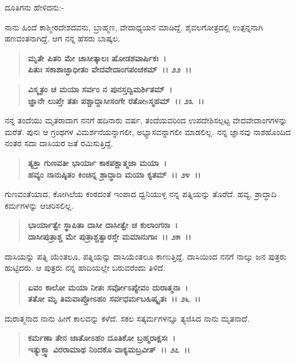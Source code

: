 \begin{flushleft}
ದೂತಿಗನು ಹೇಳಿದನು:-
\end{flushleft}

ನಾನು ಹಿಂದೆ ಕಾಶ್ಮೀರದೇಶದವನು, ಬ್ರಾಹ್ಮಣ, ವೇದಾಧ್ಯಯನ ಮಾಡಿದ್ದೆ. ಶೈವಲಗೋತ್ರದಲ್ಲಿ ಉತ್ಪನ್ನನಾಗಿ ಹಣವಂತನಾಗಿದ್ದೆ. ಆಗ ನನ್ನ ಹೆಸರು ಬಾಷ್ಕಲ.

\begin{verse}
\textbf{ಮೃತೇ ಪಿತರಿ ಮೇ ಚಾಸೀತ್ಕಾಲಃ ಷೋಡಶವಾರ್ಷಿಕಃ~।}\\\textbf{ಪಿತುಃ ಸಕಾಶಾಚ್ಛಾಧೀತಂ ವೇದವೇದಾಂಗಪಂಚಕಮ್~।। ೨೨~।। }
\end{verse}

\begin{verse}
\textbf{ವಿಸ್ಮೃತಂ ಚ ಮಯಾ ಸರ್ವಂ ನ ಪುನಸ್ತದ್ವಿಮರ್ಶಿತಮ್~।}\\\textbf{ಜ್ಞಾನೇ ಲುಪ್ತೇ ತತಃ ಪಶ್ಚಾದ್ದಾಸೀಸಂಗೇ ರತೋsಸ್ಮಹಮ್~।। ೨೩~।।}
\end{verse}

ನನ್ನ ತಂದೆಯು ಮೃತರಾದಾಗ ನನಗೆ ಹದಿನಾರು ವರ್ಷ, ತಂದೆಯವರಿಂದ ಉಪದೇಶಿಸಲ್ಪಟ್ಟ ವೇದವೇದಾಂಗಗಳನ್ನು ಮರೆತೆ. ಪುನಃ ಆ ಗ್ರಂಥಗಳ ವಿಮರ್ಶನೆಯನ್ನಾಗಲೀ, ಅಭ್ಯಾಸವನ್ನಾಗಲೀ ಮಾಡಲಿಲ್ಲ. ನನ್ನ ಜ್ಞಾನವು ನಾಶಹೊಂದಿದ ನಂತರ ಸದಾ ದಾಸಿಯರ ಜತೆ ರಮಿಸುತ್ತಿದ್ದೆ.

\begin{verse}
\textbf{ತ್ಯಕ್ತಾ ಗುಣವತೀ ಭಾರ್ಯಾ ಕಾಕಪಕ್ಷಾತ್ಮಜಾ ಮಯಾ~।}\\\textbf{ಹವ್ಯಂ ನಾನುಷ್ಠಿತಂ ಕಿಂಚಿನ್ನ ಶ್ರಾದ್ಧಾದಿ ಮಯಾ ಕೃತಮ್~।। ೨೪~।।}
\end{verse}

ಗುಣವಂತೆಯಾದ, ಕೋಗಿಲೆಯ ಕಂಠದಂತೆ ಇಂಪಾದ ಧ್ವನಿಯುಳ್ಳ ನನ್ನ ಪತ್ನಿಯನ್ನು ತೊರೆದೆ. ಹವ್ಯ, ಶ್ರಾದ್ಧಾದಿ ಕರ್ಮಗಳನ್ನು ಆಚರಿಸಲಿಲ್ಲ.

\begin{verse}
\textbf{ಭಾರ್ಯಾತ್ವೇ ಸ್ಥಾಪಿತಾ ದಾಸೀ ದಾಸೀತ್ವೇ ಚ ಕುಲಾಂಗನಾ~।}\\\textbf{ದಾಸೀಪುತ್ರಾಶ್ಚ ಮೇ ಪುತ್ರಾಶ್ಚತ್ವಾರಸ್ತೇ ಮಮಾನುಗಾಃ~।। ೨೫~।।}
\end{verse}

ದಾಸಿಯನ್ನು ಪತ್ನಿ ಯೆಂತಲೂ, ಪತ್ನಿಯನ್ನು ದಾಸಿಯೆಂತಲೂ ಕಾಣುತ್ತಿದ್ದೆ. ದಾಸಿಯಿಂದ ನನಗೆ ನಾಲ್ಕು ಜನ ಪುತ್ರರು ಹುಟ್ಟಿದರು. ಆ ಪುತ್ರರು ನನ್ನ ಹಾದಿಯಲ್ಲೇ ಬರುವರೆಂದು ತಿಳಿದೆ.

\begin{verse}
\textbf{ಏವಂ ಕಾಲೋ ಮಯಾ ನೀತಃ ಸರ್ವೋಽಪ್ಯೇವಂ ದುರಾತ್ಮನಾ~।}\\\textbf{ತತೋ ಮೃ ತಿಮವಾಪ್ತೋಽಹಂ ಸರ್ವಧರ್ಮಬಹಿಷ್ಕೃತಃ~।। ೨೬~।।}
\end{verse}

ದುರಾತ್ಮನಾದ ನಾನು ಹೀಗೆ ಕಾಲವನ್ನು ಕಳೆದೆ. ಸಕಲ ಸತ್ಕರ್ಮಗಳನ್ನೂ ತ್ಯಜಿಸಿದ ನಾನು ಮೃತನಾದೆ.

\begin{verse}
\textbf{ಕರ್ಮಣಾ ತೇನ ಜಾತೋಽಹಂ ದೂತಿಕೋ ಬ್ರಹ್ಮರಾಕ್ಷಸಃ~।}\\\textbf{ಇತ್ಯುಕ್ತ್ವಾ ವಿರರಾಮಾಥ ನಿಂದಕೊ ವಾಕ್ಯಮಬ್ರವೀತ್~।। ೨೭~।।}
\end{verse}

